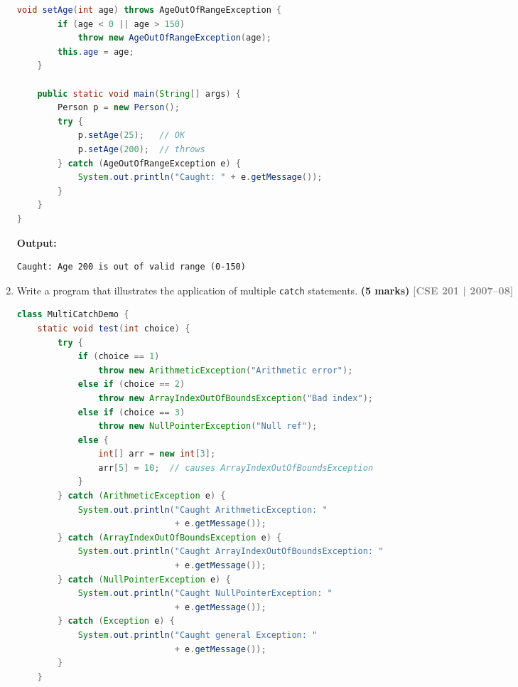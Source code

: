 \documentclass[12pt,a3paper]{article}
\newcommand{\yr}[1]{\hfill\textcolor{gray}{\small\textbf{[#1]}}}
\newcommand{\mk}[1]{\textcolor{orange!70!black}{\small\textbf{(#1 marks)}}}
\begin{document}
\begin{enumerate}
\begin{tcolorbox}[enhanced,breakable,ansbox,
  colback=cE!4,colframe=cE,boxrule=0.8pt,arc=5pt,
  title={\textbf{Answer --- Creating a User-Defined Exception}},
  fonttitle=\bfseries\color{white},colbacktitle=cE]
\begin{lstlisting}[language=Java]
    void setAge(int age) throws AgeOutOfRangeException {
        if (age < 0 || age > 150)
            throw new AgeOutOfRangeException(age);
        this.age = age;
    }

    public static void main(String[] args) {
        Person p = new Person();
        try {
            p.setAge(25);   // OK
            p.setAge(200);  // throws
        } catch (AgeOutOfRangeException e) {
            System.out.println("Caught: " + e.getMessage());
        }
    }
}
\end{lstlisting}
\textbf{Output:}
\begin{verbatim}
Caught: Age 200 is out of valid range (0-150)
\end{verbatim}
\end{tcolorbox}



\item Write a program that illustrates the application of multiple \texttt{catch} statements. \mk{5}
\yr{CSE 201 | 2007--08}

\begin{tcolorbox}[enhanced,breakable,ansbox,
  colback=cE!4,colframe=cE,boxrule=0.8pt,arc=5pt,
  title={\textbf{Answer --- Multiple catch Statements}},
  fonttitle=\bfseries\color{white},colbacktitle=cE]
\begin{lstlisting}[language=Java]
class MultiCatchDemo {
    static void test(int choice) {
        try {
            if (choice == 1)
                throw new ArithmeticException("Arithmetic error");
            else if (choice == 2)
                throw new ArrayIndexOutOfBoundsException("Bad index");
            else if (choice == 3)
                throw new NullPointerException("Null ref");
            else {
                int[] arr = new int[3];
                arr[5] = 10;  // causes ArrayIndexOutOfBoundsException
            }
        } catch (ArithmeticException e) {
            System.out.println("Caught ArithmeticException: "
                               + e.getMessage());
        } catch (ArrayIndexOutOfBoundsException e) {
            System.out.println("Caught ArrayIndexOutOfBoundsException: "
                               + e.getMessage());
        } catch (NullPointerException e) {
            System.out.println("Caught NullPointerException: "
                               + e.getMessage());
        } catch (Exception e) {
            System.out.println("Caught general Exception: "
                               + e.getMessage());
        }
    }


\end{lstlisting}
\end{tcolorbox}
\end{enumerate}
\end{document}
